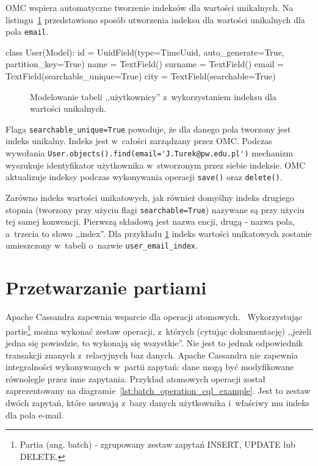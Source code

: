 OMC wspiera automatyczne tworzenie indeksów dla wartości unikalnych. Na listingu~\ref{lst:omc_unique_index_modeling} przedstawiono sposób utworzenia indeksu dla wartości unikalnych dla pola \verb+email+.

\begin{verbbox}[\footnotesize]
class User(Model):
    id = UuidField(type=TimeUuid, auto_generate=True, partition_key=True)
    name = TextField()
    surname = TextField()
    email = TextField(searchable_unique=True)
    city = TextField(searchable=True)
\end{verbbox}

\begin{figure}[ht!]
	\centering
	\theverbbox
	\caption{Modelowanie tabeli ,,użytkownicy'' z~wykorzystaniem indeksu dla wartości unikalnych.}
	\label{lst:omc_unique_index_modeling}
\end{figure}

Flaga \verb+searchable_unique=True+ powoduje, że dla danego pola tworzony jest indeks unikalny. Indeks jest w~całości zarządzany przez OMC. Podczas wywołania \verb+User.objects().find(email='J.Turek@pw.edu.pl')+ mechanizm wyszukuje identyfikator użytkownika w~stworzonym przez siebie indeksie. OMC aktualizuje indeksy podczas wykonywania operacji \verb+save()+ oraz \verb+delete()+.

Zarówno indeks wartości unikatowych, jak również domyślny indeks drugiego stopnia (tworzony przy użyciu flagi \verb+searchable=True+) nazywane są przy użyciu tej samej konwencji. Pierwszą składową jest nazwa encji, drugą - nazwa pola, a~trzecia to słowo ,,index''. Dla przykładu \ref{lst:omc_unique_index_modeling} indeks wartości unikatowych zostanie umieszczony w~tabeli o~nazwie \verb+user_email_index+.

\section{Przetwarzanie partiami}
\label{sec:batch_processing}

Apache Cassandra zapewnia wsparcie dla operacji atomowych.~\cite{cassandra_batch_operations} Wykorzystując partie\footnote{Partia (ang. batch) - zgrupowany zestaw zapytań INSERT, UPDATE lub DELETE.} można wykonać zestaw operacji, z~których (cytując dokumentację) ,,jeżeli jedna się powiedzie, to wykonają się wszystkie''. Nie jest to jednak odpowiednik transakcji znanych z~relacyjnych baz danych. Apache Cassandra nie zapewnia integralności wykonywanych w~partii zapytań: dane mogą być modyfikowane równolegle przez inne zapytania. Przykład atomowych operacji został zaprezentowany na diagramie~\ref{lst:batch_operation_cql_example}. Jest to zestaw dwóch zapytań, które usuwają z~bazy danych użytkownika i~właściwy mu indeks dla pola e-mail.

